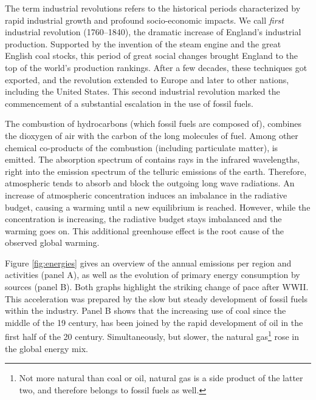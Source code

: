     The term industrial revolutions refers to the historical periods characterized by rapid industrial growth and profound socio-economic impacts. We call \textit{first} industrial revolution (1760--1840), the dramatic increase of England's industrial production. Supported by the invention of the steam engine and the great English coal stocks, this period of great social changes brought England to the top of the world's production rankings. %
    After a few decades, these techniques got exported, and the revolution extended to Europe and later to other nations, including the United States. This second industrial revolution marked the commencement of a substantial escalation in the use of fossil fuels.
    
    The combustion of hydrocarbons (which fossil fuels are composed of), combines the dioxygen of air with the carbon of the long molecules of fuel. Among other chemical co-products of the combustion (including particulate matter),  is emitted. 
    The absorption spectrum of  contains rays in the infrared wavelengths, right into the emission spectrum of the telluric emissions of the earth. Therefore, atmospheric  tends to absorb and block the outgoing long wave radiations. 
    An increase of  atmospheric concentration induces an imbalance in the radiative budget, causing a warming until a new equilibrium is reached. However, while the concentration is increasing, the radiative budget stays imbalanced and the warming goes on.
    This additional greenhouse effect is the root cause of the observed global warming.
    
    Figure \ref{fig:energies} gives an overview of the annual  emissions per region and activities (panel A), as well as the evolution of primary energy consumption by sources (panel B).
    Both graphs highlight the striking change of pace after WWII. This acceleration was prepared by the slow but steady development of fossil fuels within the industry. Panel B shows that the increasing use of coal since the middle of the 19 century, has been joined by the rapid development of oil in the first half of the 20 century. Simultaneously, but slower, the natural gas\footnote{Not more natural than coal or oil, natural gas is a side product of the latter two, and therefore belongs to fossil fuels as well.} rose in the global energy mix.
    
